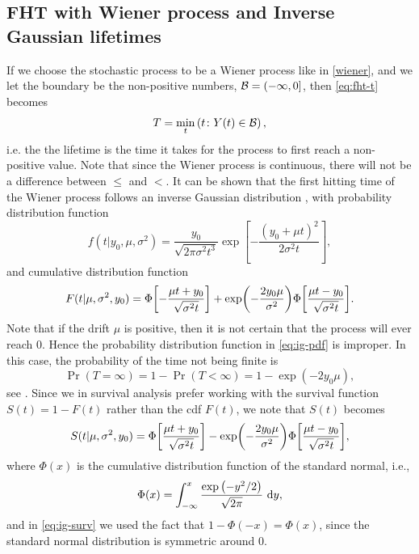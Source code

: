 \subsection{FHT with Wiener process and Inverse Gaussian lifetimes}
If we choose the stochastic process to be a Wiener process like in \eqref{wiener}, and we let the boundary be the non-positive numbers, $\mathcal{B}=(-\infty,0]$, then \eqref{eq:fht-t} becomes
\begin{equation}
    T=\min_t\left(t\colon Y(t)\in\mathcal{B}\right),
\end{equation}
i.e. the the lifetime is the time it takes for the process to first reach a non-positive value.
Note that since the Wiener process is continuous, there will not be a difference between $\leq$ and $<$. It can be shown that the first hitting time of the Wiener process follows an inverse Gaussian distribution \citep{chhikara1988}, with probability distribution function
\begin{equation}
\label{eq:ig-pdf}
    f(t|y_0,\mu,\sigma^2)=\frac{y_0}{\sqrt{2\pi\sigma^2t^3}}\exp\left[-\frac{(y_0+\mu t)^2}{2\sigma^2t}\right],
\end{equation}
and cumulative distribution function
\begin{equation}
\label{eq:ig-cdf}
    F(t|\mu,\sigma^2,y_0)=\Phi\sqb*{-\frac{\mu t+y_0}{\sqrt{\sigma^2t}}}+\exp\p*{-\frac{2y_0\mu}{\sigma^2}}\Phi\sqb*{\frac{\mu t-y_0}{\sqrt{\sigma^2t}}}.
\end{equation}
Note that if the drift $\mu$ is positive, then it is not certain that the process will ever reach 0. Hence the probability distribution function in \eqref{eq:ig-pdf} is improper. In this case, the probability of the time not being finite is
\begin{equation*}
    \Pr{}(T=\infty)=1-\Pr{}(T<\infty)=1-\exp{(-2y_0\mu)},
\end{equation*}
see \citet{cox1965}. Since we in survival analysis prefer working with the survival function $S(t)=1-F(t)$ rather than the cdf $F(t)$, we note that $S(t)$ becomes
\begin{equation}
\label{eq:ig-surv}
    S(t|\mu,\sigma^2,y_0)=\Phi\sqb*{\frac{\mu t+y_0}{\sqrt{\sigma^2t}}}-\exp\p*{-\frac{2y_0\mu}{\sigma^2}}\Phi\sqb*{\frac{\mu t-y_0}{\sqrt{\sigma^2t}}},
\end{equation}
where $\Phi(x)$ is the cumulative distribution function of the standard normal, i.e.,
\begin{equation}
    \Phi(x)=\int_{-\infty}^x\frac{\exp\left(-y^2/2\right)}{\sqrt{2\pi}}\text{~d}y,
\end{equation}
and in \eqref{eq:ig-surv} we used the fact that $1-\Phi(-x)=\Phi(x)$, since the standard normal distribution is symmetric around 0.

